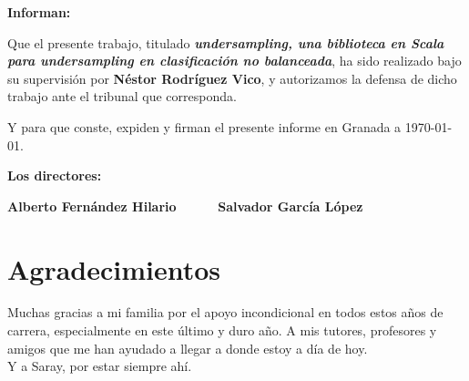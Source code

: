 \vspace{0.5cm}

\textbf{Informan:}

\vspace{0.5cm}

Que el presente trabajo, titulado \textit{\textbf{undersampling, una biblioteca en Scala para \textit{undersampling} en clasificación no balanceada}}, ha sido realizado bajo su supervisión por \textbf{Néstor Rodríguez Vico}, y autorizamos la defensa de dicho trabajo ante el tribunal que corresponda.

\vspace{0.5cm}

Y para que conste, expiden y firman el presente informe en Granada a \today.

\vspace{1cm}

\textbf{Los directores:}

\vspace{5cm}

\noindent \textbf{Alberto Fernández Hilario \ \ \ \ \ Salvador García López}

\chapter*{Agradecimientos}
\thispagestyle{empty}

       \vspace{1cm}


Muchas gracias a mi familia por el apoyo incondicional en todos estos años de carrera, especialmente en este último y duro año. A mis tutores, profesores y amigos que me han ayudado a llegar a donde estoy a día de hoy. \\

Y a Saray, por estar siempre ahí.